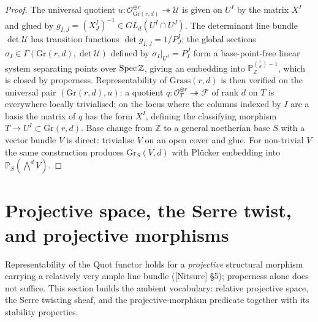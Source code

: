 \begin{proof}
  The universal quotient \(u : \mathcal{O}_{\mathrm{Gr}(r,d)}^{\oplus r}
  \twoheadrightarrow \mathcal{U}\) is given on \(U^I\) by the matrix \(X^I\)
  and glued by \(g_{I,J} = (X^I_J)^{-1} \in GL_d(U^I \cap U^J)\). The
  determinant line bundle \(\det\mathcal{U}\) has transition functions
  \(\det g_{I,J} = 1/P^I_J\); the global sections
  \(\sigma_I \in \Gamma(\mathrm{Gr}(r,d), \det\mathcal{U})\) defined by
  \(\sigma_I|_{U^J} = P^J_I\) form a base-point-free linear system separating
  points over \(\operatorname{Spec}\mathbb{Z}\), giving an embedding into
  \(\mathbb{P}^{\binom{r}{d}-1}_{\mathbb{Z}}\), which is closed by
  properness. Representability of \(\mathrm{Grass}(r,d)\) is then verified
  on the universal pair \((\mathrm{Gr}(r,d), u)\): a quotient
  \(q : \mathcal{O}_T^{\oplus r} \twoheadrightarrow \mathcal{F}\) of
  rank \(d\) on \(T\) is everywhere locally trivialised; on the locus where
  the columns indexed by \(I\) are a basis the matrix of \(q\) has the form
  \(X^I\), defining the classifying morphism \(T \to U^I \subset
  \mathrm{Gr}(r,d)\). Base change from \(\mathbb{Z}\) to a general noetherian
  base \(S\) with a vector bundle \(V\) is direct: trivialise \(V\) on an open
  cover and glue. For non-trivial \(V\) the same construction produces
  \(\mathrm{Gr}_S(V, d)\) with Pl\"ucker embedding into
  \(\mathbb{P}_S(\bigwedge^d V)\).
\end{proof}


\section{Projective space, the Serre twist, and projective morphisms}
\label{sec:projective_vocabulary}

Representability of the Quot functor holds for a \emph{projective} structural
morphism carrying a relatively very ample line bundle
([Nitsure] \S 5); properness alone does not suffice.  This
section builds the ambient vocabulary: relative projective space, the Serre
twisting sheaf, and the projective-morphism predicate together with its
stability properties.

